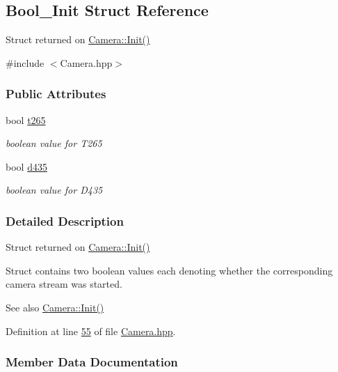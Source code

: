 \hypertarget{structBool__Init}{}\subsection{Bool\+\_\+\+Init Struct Reference}
\label{structBool__Init}


Struct returned on \hyperlink{classCamera_a7f09b843d9b3a97e78eefcebbc53e054}{Camera\+::\+Init()}  




{\ttfamily \#include $<$Camera.\+hpp$>$}

\subsubsection*{Public Attributes}
\begin{DoxyCompactItemize}
\item 
bool \hyperlink{structBool__Init_a28c7d578113b5a52c1706c10be8fe6c6}{t265}
\begin{DoxyCompactList}\small\item\em boolean value for T265 \end{DoxyCompactList}\item 
bool \hyperlink{structBool__Init_a9b59846a335953ae88cad02cd9cf9b34}{d435}
\begin{DoxyCompactList}\small\item\em boolean value for D435 \end{DoxyCompactList}\end{DoxyCompactItemize}


\subsubsection{Detailed Description}
Struct returned on \hyperlink{classCamera_a7f09b843d9b3a97e78eefcebbc53e054}{Camera\+::\+Init()} 

Struct contains two boolean values each denoting whether the corresponding camera stream was started. \begin{DoxySeeAlso}{See also}
\hyperlink{classCamera_a7f09b843d9b3a97e78eefcebbc53e054}{Camera\+::\+Init()} 
\end{DoxySeeAlso}


Definition at line \hyperlink{Camera_8hpp_source_l00055}{55} of file \hyperlink{Camera_8hpp_source}{Camera.\+hpp}.



\subsubsection{Member Data Documentation}
